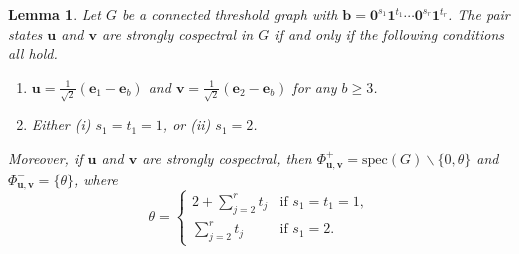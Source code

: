 \documentclass[preprint]{elsarticle}
\newcommand{\supp}{{\Phi}}
\newcommand\spec{{\mathrm{spec}}}
\newtheorem{lema}[theorem]{Lemma}
\begin{document}
\begin{lema}
\label{sc}
Let $G$ be a connected threshold graph with $\mathbf{b}=\mathbf{0}^{s_1}\mathbf{1}^{t_1}\cdots \mathbf{0}^{s_r}\mathbf{1}^{t_r}$. The pair states $\mathbf{u}$ and $\mathbf{v}$ are strongly cospectral in $G$
if and only if the following conditions all hold.
\begin{enumerate}
\item $\mathbf{u}=\frac{1}{\sqrt2}(\mathbf{e}_1-\mathbf{e}_b)$ and $\mathbf{v}=\frac{1}{\sqrt2}(\mathbf{e}_2-\mathbf{e}_b)$ for any $b\geq 3$.
\item Either (i) $s_1=t_1=1$, or (ii) $s_1=2$.
\end{enumerate}
Moreover, if $\mathbf{u}$ and $\mathbf{v}$ are strongly cospectral, then $\supp_{\mathbf{u},\mathbf{v}}^+=\spec(G)\backslash\{0,\theta\} $ and $ \supp_{\mathbf{u},\mathbf{v}}^-=\{\theta\}$, where
\begin{equation}
\label{theta}
\theta=
  \begin{cases}
    2+\sum_{j=2}^rt_j & \text{if $s_1=t_1=1$},\\
    \sum_{j=2}^rt_j & \text{if $s_1=2$}.
  \end{cases}
\end{equation}
\end{lema}
\end{document}
